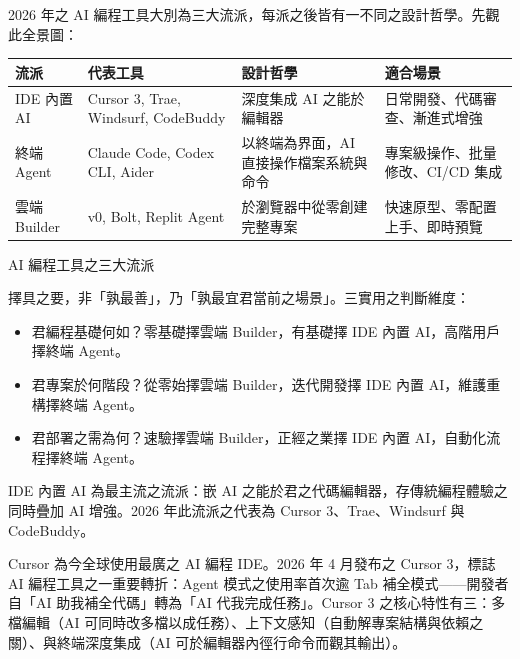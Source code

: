 


2026 年之 AI 編程工具大別為三大流派，每派之後皆有一不同之設計哲學。先觀此全景圖：

\begin{center}
\begin{tabularx}{\linewidth}{|X|X|X|X|}
\hline
\textbf{流派} & \textbf{代表工具} & \textbf{設計哲學} & \textbf{適合場景} \tabularnewline
\hline
IDE 內置 AI & Cursor 3, Trae, Windsurf, CodeBuddy & 深度集成 AI 之能於編輯器 & 日常開發、代碼審查、漸進式增強 \tabularnewline
終端 Agent & Claude Code, Codex CLI, Aider & 以終端為界面，AI 直接操作檔案系統與命令 & 專案級操作、批量修改、CI/CD 集成 \tabularnewline
雲端 Builder & v0, Bolt, Replit Agent & 於瀏覽器中從零創建完整專案 & 快速原型、零配置上手、即時預覽 \tabularnewline
\hline
\end{tabularx}
\end{center}

\begin{center}\small\color{gray}AI 編程工具之三大流派\end{center}

擇具之要，非「孰最善」，乃「孰最宜君當前之場景」。三實用之判斷維度：

\begin{itemize}
  \item 君編程基礎何如？零基礎擇雲端 Builder，有基礎擇 IDE 內置 AI，高階用戶擇終端 Agent。
  \item 君專案於何階段？從零始擇雲端 Builder，迭代開發擇 IDE 內置 AI，維護重構擇終端 Agent。
  \item 君部署之需為何？速驗擇雲端 Builder，正經之業擇 IDE 內置 AI，自動化流程擇終端 Agent。
\end{itemize}


IDE 內置 AI 為最主流之流派：嵌 AI 之能於君之代碼編輯器，存傳統編程體驗之同時疊加 AI 增強。2026 年此流派之代表為 Cursor 3、Trae、Windsurf 與 CodeBuddy。


Cursor 為今全球使用最廣之 AI 編程 IDE。2026 年 4 月發布之 Cursor 3，標誌 AI 編程工具之一重要轉折：Agent 模式之使用率首次逾 Tab 補全模式——開發者自「AI 助我補全代碼」轉為「AI 代我完成任務」。Cursor 3 之核心特性有三：多檔編輯（AI 可同時改多檔以成任務）、上下文感知（自動解專案結構與依賴之關）、與終端深度集成（AI 可於編輯器內徑行命令而觀其輸出）。

